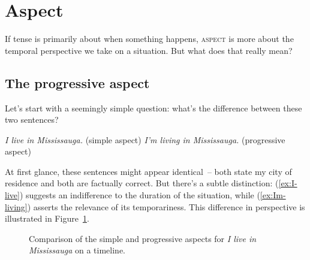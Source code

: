 \section{Aspect}
If tense is primarily about when something happens, \textsc{aspect} is more about the temporal perspective we take on a situation. But what does that really mean?

\subsection{The progressive aspect}\label{sec:progressive-aspect}
Let's start with a seemingly simple question: what's the difference between these two sentences?

\ea
\ea \textit{I live in Mississauga.} \hfill(simple aspect) \label{ex:I-live}
\ex \textit{I'm living in Mississauga.} \hfill(progressive aspect) \label{ex:Im-living}
\z\z

At first glance, these sentences might appear identical~-- both state my city of residence and both are factually correct. But there's a subtle distinction: (\ref{ex:I-live}) suggests an indifference to the duration of the situation, while (\ref{ex:Im-living}) asserts the relevance of its temporariness. This difference in perspective is illustrated in Figure~\ref{fig:enter-label}.

\begin{figure}[ht]
    \centering
    \caption{Comparison of the simple and progressive aspects for \textit{I live in Mississauga} on a timeline.}
    \label{fig:enter-label}
\end{figure}

